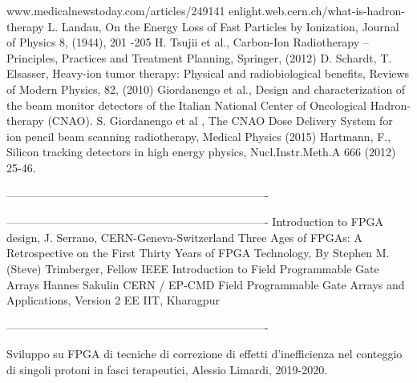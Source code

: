 \begin{thebibliography}{00}	
	www.medicalnewstoday.com/articles/249141
	enlight.web.cern.ch/what-is-hadron-therapy
	L. Landau, On the Energy Loss of Fast Particles by Ionization, Journal of
	Physics 8, (1944), 201 -205
	H. Tsujii et al., Carbon-Ion Radiotherapy – Principles, Practices and Treatment
	Planning, Springer, (2012)
	D. Schardt, T. Elsasser, Heavy-ion tumor therapy: Physical and radiobiological
	benefits, Reviews of Modern Physics, 82, (2010)
	Giordanengo et al., Design and characterization of the beam monitor detectors
	of the Italian National Center of Oncological Hadron-therapy (CNAO).
	S. Giordanengo et al , The CNAO Dose Delivery System for ion pencil beam
	scanning radiotherapy, Medical Physics (2015)
	Hartmann, F., Silicon tracking detectors in high energy physics, Nucl.Instr.Meth.A
	666 (2012) 25-46.
	
	----------------------------------------------------------------------
	
	----------------------------------------------------------------------
	Introduction to FPGA design, J. Serrano, CERN-Geneva-Switzerland
	Three Ages of FPGAs: A Retrospective on the First Thirty Years of FPGA Technology, By Stephen M. (Steve) Trimberger, Fellow IEEE
	Introduction to Field Programmable Gate Arrays Hannes Sakulin CERN / EP-CMD
	Field Programmable Gate Arrays and Applications, Version 2 EE IIT, Kharagpur
	
	
	----------------------------------------------------------------------
	
	Sviluppo su FPGA di tecniche di correzione di effetti d'inefficienza nel conteggio di singoli protoni in fasci terapeutici, Alessio Limardi, 2019-2020.
	
\end{thebibliography}

